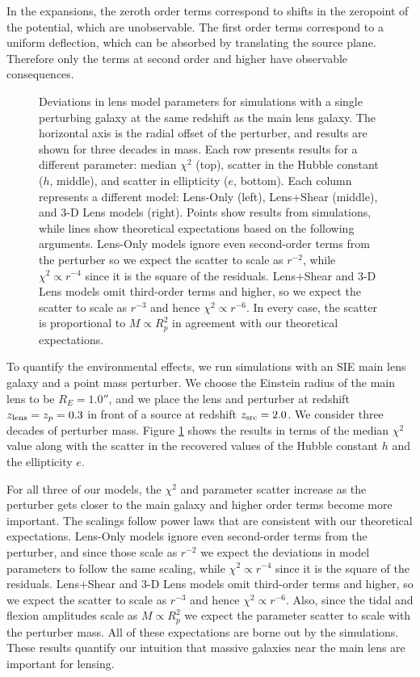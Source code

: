 \documentclass{emulateapj}
\begin{document}
In the expansions, the zeroth order terms correspond to shifts in the zeropoint of the potential, which are unobservable.  The first order terms correspond to a uniform deflection, which can be absorbed by translating the source plane.  Therefore only the terms at second order and higher have observable consequences.

\begin{figure}[t]
\begin{center}
\caption{\label{fig:toyr3} Deviations in lens model parameters for simulations with a single perturbing galaxy at the same redshift as the main lens galaxy.  The horizontal axis is the radial offset of the perturber, and results are shown for three decades in mass.  Each row presents results for a different parameter: median $\chi^2$ (top), scatter in the Hubble constant ($h$, middle), and scatter in ellipticity ($e$, bottom).  Each column represents a different model: Lens-Only (left), Lens+Shear (middle), and 3-D Lens models (right). Points show results from simulations, while lines show theoretical expectations based on the following arguments.  Lens-Only models ignore even second-order terms from the perturber so we expect the scatter to scale as $r^{-2}$, while $\chi^2 \propto r^{-4}$ since it is the square of the residuals.  Lens+Shear and 3-D Lens models omit third-order terms and higher, so we expect the scatter to scale as $r^{-3}$ and hence $\chi^2 \propto r^{-6}$.  In every case, the scatter is proportional to $M \propto R_p^2$ in agreement with our theoretical expectations.%
}
\end{center}
\end{figure}

To quantify the environmental effects, we run simulations with an SIE main lens galaxy and a point mass perturber.  We choose the Einstein radius of the main lens to be $R_E = 1.0''$, and we place the lens and perturber at redshift $z_{\rm{lens}} = z_p = 0.3$ in front of a source at redshift $z_{\rm{src}} = 2.0$.  We consider three decades of perturber mass.  Figure \ref{fig:toyr3} shows the results in terms of the median $\chi^2$ value along with the scatter in the recovered values of the Hubble constant $h$ and the ellipticity $e$.

For all three of our models, the $\chi^2$ and parameter scatter increase as the perturber gets closer to the main galaxy and higher order terms become more important.  The scalings follow power laws that are consistent with our theoretical expectations.  Lens-Only models ignore even second-order terms from the perturber, and since those scale as $r^{-2}$ we expect the deviations in model parameters to follow the same scaling, while $\chi^2 \propto r^{-4}$ since it is the square of the residuals.  Lens+Shear and 3-D Lens models omit third-order terms and higher, so we expect the scatter to scale as $r^{-3}$ and hence $\chi^2 \propto r^{-6}$. Also, since the tidal and flexion amplitudes scale as $M \propto R_p^2$ we expect the parameter scatter to scale with the perturber mass.  All of these expectations are borne out by the simulations.  These results quantify our intuition that massive galaxies near the main lens are important for lensing.
\end{document}
